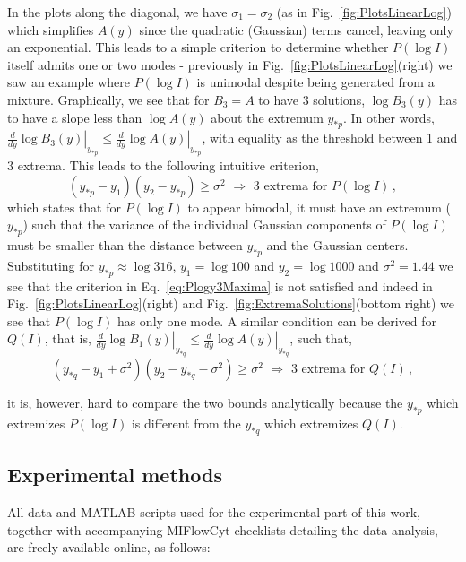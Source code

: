 \documentclass[11pt,a4paper,draft]{article}
\begin{document}
In the plots along the diagonal, we have $\sigma_1=\sigma_2$ (as in Fig.~\ref{fig:PlotsLinearLog})  which simplifies $A(y)$ since the quadratic (Gaussian) terms cancel, leaving only an exponential. This leads to a simple criterion to determine whether $P(\log I)$ itself admits one or two modes - previously in Fig.~\ref{fig:PlotsLinearLog}(right) we saw an example where $P(\log I)$ is unimodal despite being generated from a mixture. Graphically, we see that for $B_3=A$ to have 3 solutions, $\log B_3(y)$ has to have a slope less than $\log A(y)$ about the extremum $y_{*p}$. In other words, $\left.\frac{d}{dy} \log B_3(y)\right\vert_{y_{*p}} \le \left.\frac{d}{dy} \log A(y)\right\vert_{y_{*p}}$, with equality as the threshold between 1 and 3 extrema. This leads to the following intuitive criterion,
\begin{equation} 
(y_{*p} - y_1)(y_2 - y_{*p}) \ge \sigma ^2 \,\,\Longrightarrow \,\, \mbox{3 extrema for } P(\log I)\,,
\label{eq:Plogy3Maxima}
\end{equation}
which states that for $P(\log I)$ to appear bimodal, it must have an extremum ($y_{*p}$) such that the variance of the individual Gaussian components of $P(\log I)$ must be smaller than the distance between $y_{*p}$ and the Gaussian centers. Substituting for $y_{*p} \approx \log 316$, $y_1 = \log 100$ and $y_2=\log 1000$ and $\sigma^2 = 1.44$ we see that the criterion in Eq.~\ref{eq:Plogy3Maxima} is not satisfied and indeed in Fig.~\ref{fig:PlotsLinearLog}(right) and Fig.~\ref{fig:ExtremaSolutions}(bottom right) we see that $P(\log I)$ has only one mode. A similar condition can be derived for $Q(I)$, that is, $\left.\frac{d}{dy} \log B_1(y)\right\vert_{y_{*q}} \le \left.\frac{d}{dy} \log A(y)\right\vert_{y_{*q}}$, such that,
\begin{equation} 
(y_{*q} - y_1+\sigma^2)(y_2 - y_{*q} - \sigma^2) \ge \sigma ^2\,\,\Longrightarrow \,\,\mbox{3 extrema for } Q(I)\,,
\label{eq:QI3Maxima}
\end{equation} 

\smallskip
it is, however, hard to compare the two bounds analytically because the $y_{*p}$ which extremizes $P(\log I)$ is different from the $y_{*q}$ which extremizes $Q(I)$.

\subsection*{Experimental methods}
All data and MATLAB scripts used for the experimental part of this work, together with accompanying MIFlowCyt checklists detailing the data analysis, are freely available online, as follows:
\end{document}
